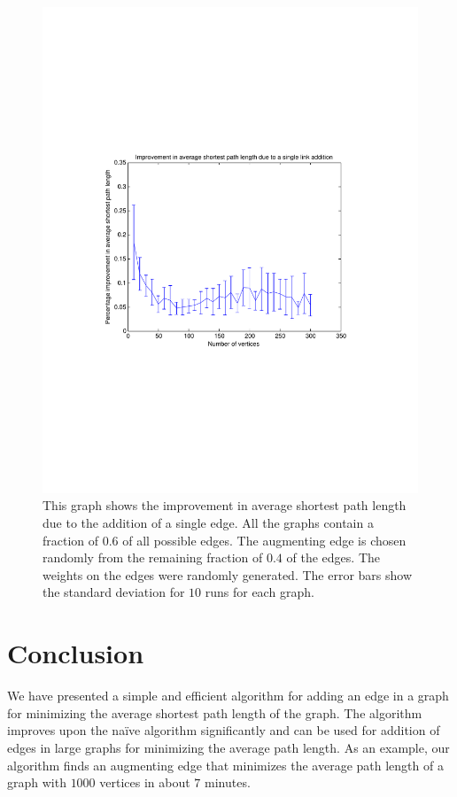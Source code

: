 \documentclass[journal,final,twocolumn,10pt,twoside]{IEEEtranTCOM}
\begin{document}
\begin{figure}
\centering
\includegraphics[scale=1.0, width=\columnwidth]{first.pdf}
\vspace{-4cm}
\caption{This graph shows the improvement in average shortest path length due to the addition of a
         single edge. All the graphs contain a fraction of $0.6$ of all possible edges. The
         augmenting edge is chosen randomly from the remaining fraction of $0.4$ of the edges. The
         weights on the edges were randomly generated. The error bars show the standard deviation for
         $10$ runs for each graph.}
\label{fig3}
\end{figure}

\section{Conclusion}

We have presented a simple and efficient algorithm for adding an edge in a graph for minimizing the average shortest path length of the graph. The algorithm improves upon the na\"ive algorithm significantly and can be used 
for addition of edges in large graphs for minimizing the average path length. As an example, our algorithm 
finds an augmenting edge that minimizes the average path length of a graph with $1000$ vertices in about 
$7$ minutes.   
\end{document}
